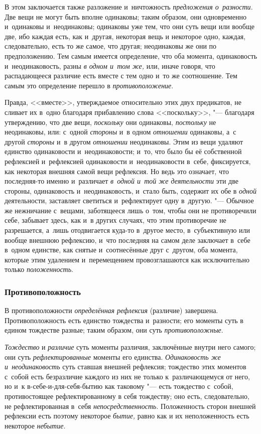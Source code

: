 В этом заключается также разложение и~ничтожность {\em
предложения о~разности}. Две вещи не могут быть вполне одинаковы; таким
образом, они одновременно и~одинаковы и~неодинаковы; одинаковы уже тем, что
они суть вещи или вообще две, ибо каждая есть, как и~другая, некоторая вещь
и некоторое одно, каждая, следовательно, есть то же самое, что другая;
неодинаковы же они по предположению. Тем самым имеется определение, что оба
момента, одинаковость и~неодинаковость, разны {\em в
одном и~том же,} или, иначе говоря, что распадающееся различие есть вместе
с тем одно и~то же соотношение. Тем самым это определение перешло в
{\em противоположение}.

Правда, <<вместе>>, утверждаемое относительно этих двух предикатов, не сливает
их в~одно благодаря прибавлению слова <<поскольку>>, "--- благодаря
утверждению, что две вещи, {\em поскольку} они
одинаковы, {\em постольку} не неодинаковы, или: с~одной
{\em стороны} и~в одном {\em отношении} одинаковы, а~с другой
{\em стороны} и~в другом {\em отношении} неодинаковы. Этим из вещи удаляют
единство одинаковости и~неодинаковости; и~то, что было бы её собственной
рефлексией и~рефлексией одинаковости и~неодинаковости в~себе, фиксируется,
как некоторая внешняя самой вещи рефлексия. Но ведь это означает, что
последняя-то именно и~различает {\em в~одной и~той же
деятельности} эти две стороны, одинаковость и~неодинаковость, и~стало быть,
содержит их обе в {\em одной} деятельности, заставляет
светиться и~рефлектирует одну в~другую. "--- Обычное же нежничание с~вещами,
заботящееся лишь о~том, чтобы они не противоречили себе, забывает здесь,
как и~в других случаях, что этим противоречие не разрешается, а~лишь
отодвигается куда-то в~другое место, в~субъективную или вообще внешнюю
рефлексию, и~что последняя на самом деле заключает в~себе в~одном единстве,
как снятые и~соотнесённые друг с~другом, оба момента, которые этим
удалением и~перемещением провозглашаются как исключительно только
{\em положенность}.


\subsubsection{Противоположность}
В противоположности {\em определённая рефлексия} (различие) завершена.
Противоположность есть единство тождества и~разности; его моменты суть в
едином тождестве разные; таким образом, они суть {\em противоположные}.

{\em Тождество} и {\em различие}
суть моменты различия, заключённые внутри него самого; они суть
{\em рефлектированные} моменты его единства.
{\em Одинаковость же и~неодинаковость} суть ставшая
внешней рефлексия; тождество этих моментов с~собой есть безразличие каждого
из них не только к~различающемуся от него, но и~к в-себе-и-для-себя-бытию
как таковому "--- есть тождество с~собой, противостоящее рефлектированному в
себя тождеству; оно есть, следовательно, не рефлектированная в~себя
{\em непосредственность}. Положенность сторон внешней
рефлексии есть поэтому некоторое {\em бытие,} равно как
и их неположенность есть некоторое {\em небытие}.

